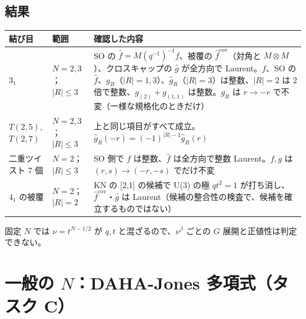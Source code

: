 \documentclass[a4paper,10pt]{ltjsarticle}
\begin{document}
\subsection{結果}
\begin{center}
\begin{tabular}{p{2.6cm}p{2.2cm}p{9.6cm}}
\toprule
結び目 & 範囲 & 確認した内容 \\
\midrule
$3_1$ & $N = 2, 3$；$|R| \le 3$ & SO の $\hat f = M(q^{-1})^{-1} f$、被覆の $\hat f^{\mathrm{cov}}$（対角と $M \otimes M$）、クロスキャップの $\hat g$ が全方向で Laurent。$f$、SO の $\hat f$、$g_R$（$|R| = 1, 3$）、$\hat g_R$（$|R| = 3$）は整数、$|R| = 2$ は 2 倍で整数、$g_{(2)} + g_{(1,1)}$ は整数。$g_R$ は $r \to -r$ で不変（一様な規格化のときだけ）\\
$T(2,5)$, $T(2,7)$ & $N = 2, 3$；$|R| \le 3$ & 上と同じ項目がすべて成立。$\hat g_R(-r) = (-1)^{|R|-1} \hat g_R(r)$\\
二重ツイスト 7 個 & $N = 2$；$|R| \le 3$ & SO 側で $f$ は整数、$\hat f$ は全方向で整数 Laurent。$f, g$ は $(r,s) \to (-r,-s)$ でだけ不変\\
$4_1$ の被覆 & $N = 2$；$|R| = 2$ & KN の [2,1] の候補で U(3) の極 $qt^2 = 1$ が打ち消し、$\hat f^{\mathrm{cov}}$・$\hat g$ は Laurent（候補の整合性の検査で、候補を確立するものではない）\\
\bottomrule
\end{tabular}
\end{center}
固定 $N$ では $\nu = t^{N - 1/2}$ が $q, t$ と混ざるので、$\nu^\beta$ ごとの $G$ 展開と正値性は判定できない。

\section{一般の $N$：DAHA-Jones 多項式（タスク C）}\label{sec:largeN}
\end{document}
